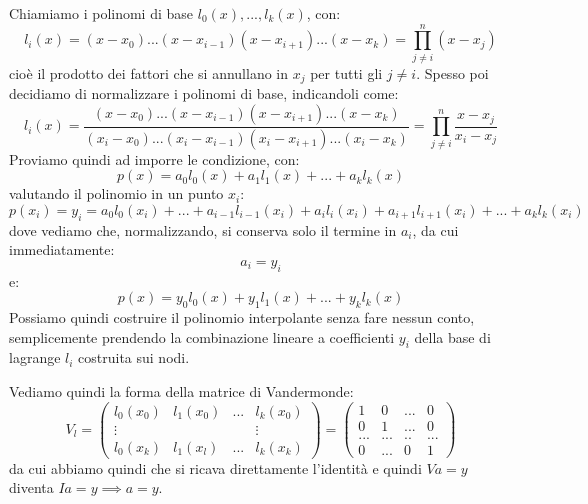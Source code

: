 \documentclass[a4paper,11pt]{article}
\begin{document}
Chiamiamo i polinomi di base $l_0(x), ..., l_k(x)$, con:
$$
l_i(x) = (x - x_0) ... (x - x_{i - 1}) (x - x_{i + 1}) ... (x - x_k) = \prod_{j \neq i}^n (x - x_j)
$$
cioè il prodotto dei fattori che si annullano in $x_j$ per tutti gli $j \neq i$.
Spesso poi decidiamo di normalizzare i polinomi di base, indicandoli come:
$$
l_i(x) = \frac{(x - x_0) ... (x - x_{i - 1}) (x - x_{i + 1}) ... (x - x_k)}{(x_i - x_0) ... (x_i - x_{i - 1}) (x_i - x_{i + 1}) ... (x_i - x_k)} = \prod_{j \neq i}^n \frac{x - x_j}{x_i - x_j} 
$$
Proviamo quindi ad imporre le condizione, con:
$$
p(x) = a_0 l_0(x) + a_1 l_1(x) + ... + a_k l_k(x)
$$
valutando il polinomio in un punto $x_i$:
$$
p(x_i) = y_i = a_0 l_0(x_i) + ... + a_{i - 1} l_{i - 1}(x_i) + a_i l_i(x_i) + a_{i + 1} l_{i + 1}(x_i) + ... + a_k l_k(x_i)
$$
dove vediamo che, normalizzando, si conserva solo il termine in $a_i$, da cui immediatamente:
$$
a_i = y_i
$$
e:
$$
p(x) = y_0 l_0(x) + y_1 l_1(x) + ... + y_k l_k(x)
$$
Possiamo quindi costruire il polinomio interpolante senza fare nessun conto, semplicemente prendendo la combinazione lineare a coefficienti $y_i$ della base di lagrange $l_i$ costruita sui nodi.

Vediamo quindi la forma della matrice di Vandermonde:
$$
V_l =
\begin{pmatrix}
	l_0(x_0) & l_1(x_0) & ... & l_k(x_0) \\ 
	\vdots & & & \vdots \\
	l_0(x_k) & l_1(x_l) & ... & l_k(x_k)
\end{pmatrix} = 
\begin{pmatrix}
	1 & 0 & ... & 0 \\
	0 & 1 & ... & 0 \\
	... & ... & .. & ... \\
	0 & ... & 0 & 1
\end{pmatrix}
$$
da cui abbiamo quindi che si ricava direttamente l'identità e quindi $Va = y$ diventa $I a = y \implies a = y$.
\end{document}
